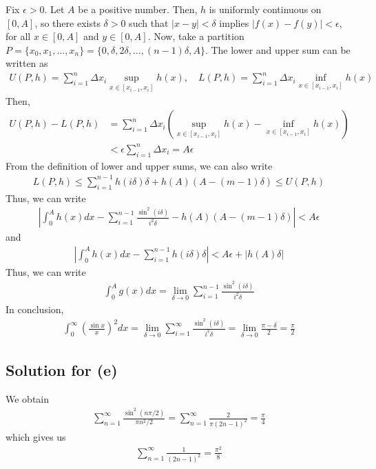 \documentclass{scrartcl}
\begin{document}
Fix \(\epsilon > 0\). Let \(A\) be a positive number. Then, \(h\) is uniformly
continuous on \([0, A]\), so there exists \(\delta > 0\) such that \(|x - y| <
\delta\) implies \(|f(x) - f(y)| < \epsilon\), for all \(x \in [0, A]\) and
\(y \in [0, A]\). Now, take a partition \(P = \{x_0, x_1, \dots, x_n\} = \{0,
\delta, 2\delta, \dots, (n - 1)\delta, A\}\). The lower and upper sum can be
written as
\begin{align*}
  U(P, h)
  = \sum^n_{i = 1} \Delta x_i \sup_{x \in [x_{i - 1}, x_i]} h(x), \quad
  L(P, h)
  = \sum^n_{i = 1} \Delta x_i \inf_{x \in [x_{i - 1}, x_i]} h(x)
\end{align*}
Then,
\begin{align*}
  U(P, h) - L(P, h)
  &= \sum^n_{i = 1} \Delta x_i \left( \sup_{x \in [x_{i - 1}, x_i]} h(x)
    - \inf_{x \in [x_{i - 1}, x_i]} h(x) \right) \\
  &< \epsilon \sum^n_{i = 1} \Delta x_i
  = A\epsilon
\end{align*}
From the definition of lower and upper sums, we can also write
\begin{align*}
  L(P, h)
  \le \sum^{n - 1}_{i = 1} h(i\delta) \delta + h(A) (A - (m - 1)\delta)
  \le U(P, h)
\end{align*}
Thus, we can write
\begin{align*}
  \left| \int^A_0 h(x) dx
  - \sum^{n - 1}_{i = 1} \frac{\sin^2 (i\delta)}{i^2 \delta}
  - h(A) (A - (m - 1)\delta) \right|
  < A\epsilon
\end{align*}
and
\begin{align*}
  \left| \int^A_0 h(x) dx
    - \sum^{n - 1}_{i = 1} h(i\delta) \delta \right|
  < A\epsilon + |h(A) \delta|
\end{align*}
Thus, we can write
\begin{align*}
  \int^A_0 g(x) dx
  = \lim_{\delta \to 0}
    \sum^{n - 1}_{i = 1} \frac{\sin^2 (i\delta)}{i^2 \delta}
\end{align*}
In conclusion,
\begin{align*}
  \int^\infty_0 \left( \frac{\sin x}{x} \right)^2 dx
  = \lim_{\delta \to 0} \sum^\infty_{i = 1} \frac{\sin^2 (i\delta)}{i^2 \delta}
  = \lim_{\delta \to 0} \frac{\pi - \delta}{2}
  = \frac{\pi}{2}
\end{align*}

\subsection{Solution for (e)}
We obtain
\begin{align*}
  \sum^\infty_{n = 1} \frac{\sin^2 (n\pi / 2)}{\pi n^2 / 2}
  = \sum^\infty_{n = 1} \frac{2}{\pi (2n - 1)^2}
  = \frac{\pi}{4}
\end{align*}
which gives us
\begin{align*}
  \sum^\infty_{n = 1} \frac{1}{(2n - 1)^2}
  = \frac{\pi^2}{8}
\end{align*}
\end{document}

